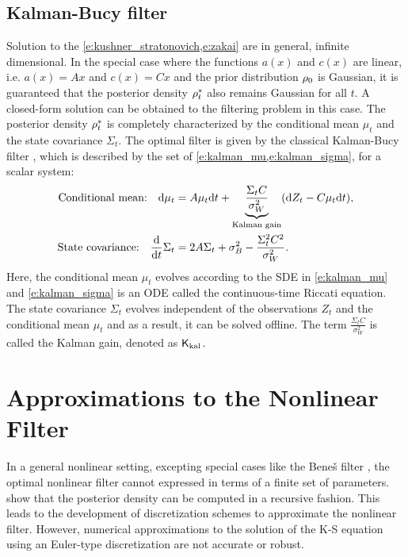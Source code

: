 \subsection{Kalman-Bucy filter}
Solution to the \cref{e:kushner_stratonovich,e:zakai} are in general, infinite dimensional. In the special case where the functions $a(x)$ and $c(x)$ are linear, i.e. $a(x) = Ax$ and $c(x) = Cx$ and the prior distribution $\rho_0$ is Gaussian, it is guaranteed that the posterior density $\rho^*_t$ also remains Gaussian for all $t$. A closed-form solution can be obtained to the filtering problem in this case. The posterior density $\rho^*_t$ is completely characterized by the conditional mean $\mu_t$ and the state covariance $\Sigma_t$. The optimal filter is given by the classical Kalman-Bucy filter \cite{kal64}, which is described by the set of \cref{e:kalman_mu,e:kalman_sigma}, for a scalar system:
\begin{align}
\text{Conditional mean:} \quad \ud \mu_t & = A \mu_t \ud t + \underbrace{\frac{\Sigma_t C}{\sigma^2_W}}_{\text{Kalman gain}} ( \ud Z_t - C \mu_t \ud t), 
\label{e:kalman_mu} \\
\text{State covariance:}  \quad  \frac{\ud}{\ud t} \Sigma_t &= 2 A \Sigma_t + \sigma^2_B - \frac{\Sigma^2_t C^2}{\sigma^2_W}. 
\label{e:kalman_sigma}
\end{align}
Here, the conditional mean $\mu_t$ evolves according to the SDE in \eqref{e:kalman_mu} and \eqref{e:kalman_sigma} is an ODE called the continuous-time Riccati equation. The state covariance $\Sigma_t$ evolves independent of the observations $Z_t$ and the conditional mean $\mu_t$ and as a result, it can be solved offline.  
The term $\frac{\Sigma_t C}{\sigma^2_W}$ is called the Kalman gain, denoted as $\sf K_{\text{kal}}$. 
\section{Approximations to the Nonlinear Filter}
\label{s:approx_nl_filter}
In a general nonlinear setting, excepting special cases like the Bene\v{s} filter \cite{ben81}, the optimal nonlinear filter cannot expressed in terms of a finite set of parameters.  show that the posterior density can be computed in a recursive fashion. This leads to the development of discretization schemes to approximate the nonlinear filter. However, numerical approximations to the solution of the K-S equation using an Euler-type discretization are not accurate or robust. 


